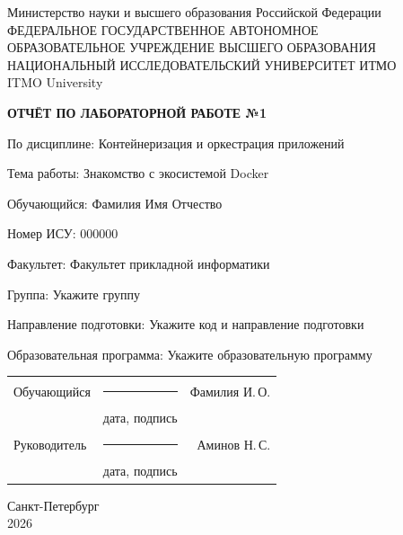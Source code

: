 \documentclass[14pt,a4paper,oneside]{extreport}
\newcommand{\LabNumber}{1}
\newcommand{\LabTitle}{Знакомство с экосистемой Docker}
\newcommand{\CourseName}{Контейнеризация и оркестрация приложений}
\newcommand{\StudentName}{Фамилия Имя Отчество}
\newcommand{\StudentShortName}{Фамилия И.\,О.}
\newcommand{\StudentISU}{000000}
\newcommand{\StudentGroup}{Укажите группу}
\newcommand{\FacultyName}{Факультет прикладной информатики}
\newcommand{\DegreeProgramme}{Укажите код и направление подготовки}
\newcommand{\EducationProgramme}{Укажите образовательную программу}
\newcommand{\TeacherName}{Аминов Н.\,С.}
\newcommand{\ReportCity}{Санкт-Петербург}
\newcommand{\ReportYear}{2026}
\begin{document}
\begin{titlepage}
  \thispagestyle{empty}
  \begin{center}
    \fontsize{12pt}{16pt}\selectfont
    Министерство науки и высшего образования Российской Федерации\\[0.25\baselineskip]
    ФЕДЕРАЛЬНОЕ ГОСУДАРСТВЕННОЕ АВТОНОМНОЕ\\
    ОБРАЗОВАТЕЛЬНОЕ УЧРЕЖДЕНИЕ ВЫСШЕГО ОБРАЗОВАНИЯ\\[0.25\baselineskip]
    НАЦИОНАЛЬНЫЙ ИССЛЕДОВАТЕЛЬСКИЙ УНИВЕРСИТЕТ ИТМО\\
    ITMO University
  \end{center}
  \vspace{0.8\baselineskip}
  \begin{center}
    \textbf{ОТЧЁТ ПО ЛАБОРАТОРНОЙ РАБОТЕ №\LabNumber}
  \end{center}
  \vspace{0.4\baselineskip}
  \begingroup
  \setlength{\parindent}{0pt}
  По дисциплине: \CourseName\par\medskip
  Тема работы: \LabTitle\par\medskip
  Обучающийся: \StudentName\par\medskip
  Номер ИСУ: \StudentISU\par\medskip
  Факультет: \FacultyName\par\medskip
  Группа: \StudentGroup\par\medskip
  Направление подготовки: \DegreeProgramme\par\medskip
  Образовательная программа: \EducationProgramme\par
  \endgroup
  \vfill
  \begin{tabularx}{\textwidth}{@{}l>{\centering\arraybackslash}Xr@{}}
    Обучающийся & \rule{25mm}{0.4pt} & \StudentShortName\\
    & {\fontsize{12pt}{14pt}\selectfont дата, подпись} &\\[0.4\baselineskip]
    Руководитель & \rule{25mm}{0.4pt} & \TeacherName\\
    & {\fontsize{12pt}{14pt}\selectfont дата, подпись} &
  \end{tabularx}
  \vfill
  \begin{center}
    \ReportCity\\
    \ReportYear
  \end{center}
\end{titlepage}
\setcounter{page}{2}
\tableofcontents

\end{document}
